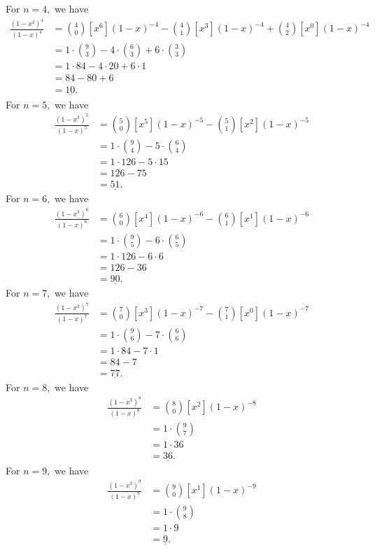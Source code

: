 \begin{enumerate}
 For $n=4,$ we have\begin{align*}[x^6] \frac{(1-x^3)^4}{(1-x)^4} &= \binom{4}{0} [x^6] (1-x)^{-4} - \binom{4}{1} [x^3] (1-x)^{-4} + \binom{4}{2} [x^0] (1-x)^{-4} \\&= 1\cdot\binom{9}{3} - 4\cdot\binom{6}{3} + 6\cdot\binom{3}{3} \\&= 1\cdot84-4\cdot20+6\cdot1 \\&= 84-80+6 \\&= \underline{10}.\end{align*}
For $n=5,$ we have\begin{align*}[x^5] \frac{(1-x^3)^5}{(1-x)^5} &= \binom{5}{0} [x^5] (1-x)^{-5} - \binom{5}{1}[x^2] (1-x)^{-5} \\&= 1\cdot\binom{9}{4}-5\cdot\binom{6}{4} \\&= 1\cdot126-5\cdot15 \\&= 126-75 \\&= \underline{51}.\end{align*}
For $n=6,$ we have\begin{align*}[x^4] \frac{(1-x^3)^6}{(1-x)^6} &= \binom{6}{0} [x^4](1-x)^{-6} - \binom{6}{1}[x^1](1-x)^{-6} \\&= 1 \cdot \binom{9}{5} - 6 \cdot \binom{6}{5} \\&= 1 \cdot 126 - 6 \cdot 6 \\&= 126-36 \\&= \underline{90}.\end{align*}
For $n=7,$ we have\begin{align*}[x^3] \frac{(1-x^3)^7}{(1-x)^7} &= \binom{7}{0}[x^3](1-x)^{-7} - \binom{7}{1}[x^0](1-x)^{-7} \\&= 1\cdot \binom{9}{6} - 7\cdot\binom{6}{6} \\&= 1\cdot84-7\cdot1\\&= 84-7 \\&= \underline{77}.\end{align*}
For $n=8,$ we have\begin{align*}[x^2] \frac{(1-x^3)^8}{(1-x)^8} &=\binom{8}{0} [x^2](1-x)^{-8} \\&= 1\cdot\binom{9}{7} \\&= 1\cdot36 \\&= \underline{36}.\end{align*}
For $n=9,$ we have\begin{align*}[x^1] \frac{(1-x^3)^9}{(1-x)^9} &= \binom{9}{0} [x^1] (1-x)^{-9}\\&= 1\cdot\binom{9}{8} \\&= 1\cdot9 \\&= \underline{9}.\end{align*}

\end{enumerate}
